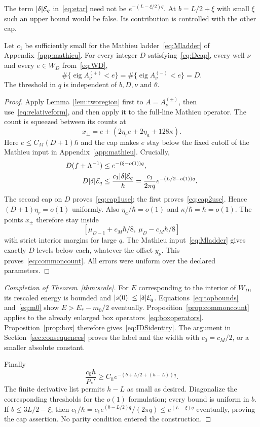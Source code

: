 The term $|\delta|\mathcal E_q$ in~\eqref{eq:etar} need not be $e^{-(L-\xi/2)q}$. At $b=L/2+\xi$ with small $\xi$ such an upper bound would be false. Its contribution is controlled with the other cap.

\begin{proposition}\label{prop:commoncount}
Let $c_1$ be sufficiently small for the Mathieu ladder~\eqref{eq:Mladder} of Appendix~\ref{app:mathieu}. For every integer $D$ satisfying~\eqref{eq:Dcap}, every well $\nu$ and every $e\in W_D$ from~\eqref{eq:WD},
\begin{equation}\label{eq:commoncount}
 \#\{\operatorname{eig}A_\nu^{(+)}<e\}
 =\#\{\operatorname{eig}A_\nu^{(-)}<e\}=D.
\end{equation}
The threshold in $q$ is independent of $b,D,\nu$ and $\theta$.
\end{proposition}
\begin{proof}
Apply Lemma~\ref{lem:tworegion} first to $A=A_\nu^{(\pm)}$, then use~\eqref{eq:relativeform}, and then apply it to the full-line Mathieu operator. The count is squeezed between its counts at
\[
 x_\pm=e\pm(2\eta_re+2\eta_a+128\kappa).
\]
Here $e\le C_M(D+1)\hbar$ and the cap makes $e$ stay below the fixed cutoff of the Mathieu input in Appendix~\ref{app:mathieu}. Crucially,
\begin{align}
 D(f+\Lambda^{-1})&\le e^{-(\xi-o(1))q},\label{eq:cap1use}\\
 D|\delta|\mathcal E_q&\le\frac{c_1|\delta|\mathcal E_q}{\hbar}
        =\frac{c_1}{2\pi q}e^{-(L/2-o(1))q}.
 \label{eq:cap2use}
\end{align}
The second cap on $D$ proves~\eqref{eq:cap1use}; the first proves~\eqref{eq:cap2use}. Hence $(D+1)\eta_r=o(1)$ uniformly. Also $\eta_a/\hbar=o(1)$ and $\kappa/\hbar=\hbar=o(1)$. The points $x_\pm$ therefore stay inside
\[
 [\mu_{D-1}+c_M\hbar/8,\ \mu_D-c_M\hbar/8]
\]
with strict interior margins for large $q$. The Mathieu input~\eqref{eq:Mladder} gives exactly $D$ levels below each, whatever the offset $y_\nu$. This proves~\eqref{eq:commoncount}. All errors were uniform over the declared parameters.
\end{proof}

\begin{proof}[Completion of Theorem~\ref{thm:scale}]
For $E$ corresponding to the interior of $W_D$, its rescaled energy is bounded and $|s(0)|\le|\delta|\mathcal E_q$. Equations~\eqref{eq:topbounds} and~\eqref{eq:m0} show $E>E_*-m_0/2$ eventually. Proposition~\ref{prop:commoncount} applies to the already enlarged box operators~\eqref{eq:boxoperators}. Proposition~\ref{prop:box} therefore gives~\eqref{eq:IDSidentity}. The argument in Section~\ref{sec:consequences} proves the label and the width with $c_0=c_M/2$, or a smaller absolute constant.

Finally
\[
 \frac{c_0\hbar}{P_*'}\ge C_he^{-(b+L/2+(h-L))q}.
\]
The finite derivative list permits $h-L$ as small as desired. Diagonalize the corresponding thresholds for the $o(1)$ formulation; every bound is uniform in $b$. If $b\le3L/2-\xi$, then
$c_1/\hbar=c_1e^{(b-L/2)q}/(2\pi q)\le e^{(L-\xi)q}$ eventually, proving the cap assertion. No parity condition entered the construction.
\end{proof}

\label{end:comparison}
